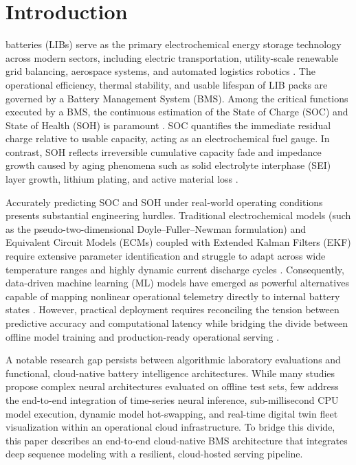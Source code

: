 \documentclass[conference]{IEEEtran}
\begin{document}
\section{Introduction}
 batteries (LIBs) serve as the primary electrochemical energy storage technology across modern sectors, including electric transportation, utility-scale renewable grid balancing, aerospace systems, and automated logistics robotics \cite{Hannan2017, Severson2019}. The operational efficiency, thermal stability, and usable lifespan of LIB packs are governed by a Battery Management System (BMS). Among the critical functions executed by a BMS, the continuous estimation of the State of Charge (SOC) and State of Health (SOH) is paramount \cite{Hannan2017}. SOC quantifies the immediate residual charge relative to usable capacity, acting as an electrochemical fuel gauge. In contrast, SOH reflects irreversible cumulative capacity fade and impedance growth caused by aging phenomena such as solid electrolyte interphase (SEI) layer growth, lithium plating, and active material loss \cite{Plett2004, Saha2007}.

Accurately predicting SOC and SOH under real-world operating conditions presents substantial engineering hurdles. Traditional electrochemical models (such as the pseudo-two-dimensional Doyle--Fuller--Newman formulation) and Equivalent Circuit Models (ECMs) coupled with Extended Kalman Filters (EKF) require extensive parameter identification and struggle to adapt across wide temperature ranges and highly dynamic current discharge cycles \cite{Plett2004, He2011}. Consequently, data-driven machine learning (ML) models have emerged as powerful alternatives capable of mapping nonlinear operational telemetry directly to internal battery states \cite{Chemali2018, Shen2022}. However, practical deployment requires reconciling the tension between predictive accuracy and computational latency while bridging the divide between offline model training and production-ready operational serving \cite{Karnehm2023}.

A notable research gap persists between algorithmic laboratory evaluations and functional, cloud-native battery intelligence architectures. While many studies propose complex neural architectures evaluated on offline test sets, few address the end-to-end integration of time-series neural inference, sub-millisecond CPU model execution, dynamic model hot-swapping, and real-time digital twin fleet visualization within an operational cloud infrastructure. To bridge this divide, this paper describes an end-to-end cloud-native BMS architecture that integrates deep sequence modeling with a resilient, cloud-hosted serving pipeline.
\end{document}
